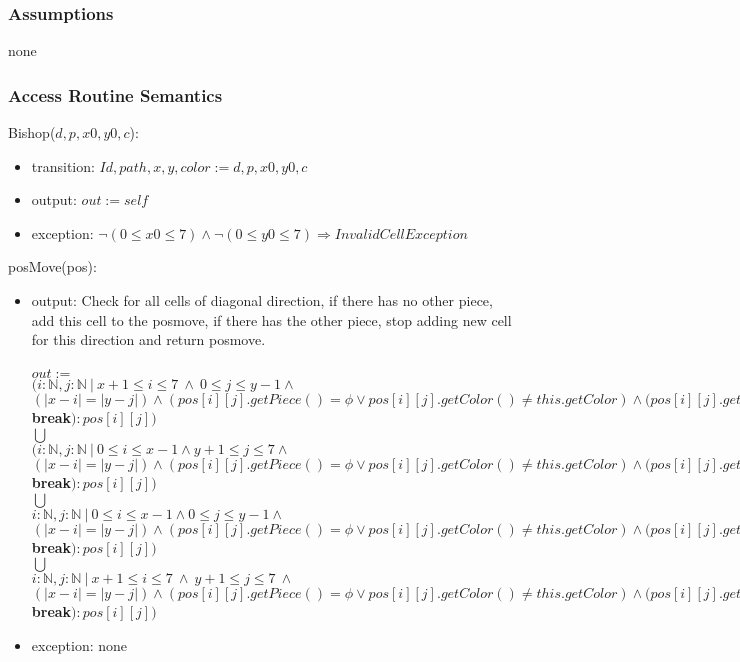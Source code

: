 \documentclass[12pt]{article}
\begin{document}
\subsubsection* {Assumptions}

none

\subsubsection* {Access Routine Semantics}

Bishop($d, p, x0, y0, c$):
\begin{itemize}
\item transition: $Id, path, x, y, color := d, p, x0, y0, c$
\item output: $out := \mathit{self}$
\item exception: $ \neg (0 \leq x0 \leq 7) \wedge  \neg (0 \leq y0 \leq 7) \Rightarrow InvalidCellException$
\end{itemize}

\noindent posMove(pos):
\begin{itemize}
\item output: Check for all cells of diagonal direction, if there has no other piece, add this cell to the posmove, if there has the other piece, stop adding new cell for this direction and return posmove.\\
\\
$out :=$\\
$(i : \mathbb{N}, j : \mathbb{N}\ |\  x + 1 \leq i \leq 7 \ \wedge \  0 \leq j \leq y - 1 \wedge $ \\
$ (|x-i| = |y-j|) \wedge (pos[i][j].getPiece() = \phi \vee pos[i][j].getColor() \ne this.getColor) \wedge (pos[i][j].getColor() = this.getColor() \Rightarrow$ \textbf{break}$) : pos[i][j])$\\
$\bigcup$ \\
$(i : \mathbb{N}, j : \mathbb{N}\ |\ 0 \leq i \leq x - 1 \wedge y + 1 \leq j \leq 7 \wedge $ \\ 
$(|x-i| = |y-j|) \wedge (pos[i][j].getPiece() = \phi \vee pos[i][j].getColor() \ne this.getColor) \wedge (pos[i][j].getColor() = this.getColor() \Rightarrow$ \textbf{break}$) : pos[i][j])$\\
$\bigcup$ \\
$i : \mathbb{N}, j : \mathbb{N}\ |\ 0 \leq i \leq x - 1 \wedge 0 \leq j \leq y - 1 \wedge \  $ \\ 
$(|x-i| = |y-j|) \wedge (pos[i][j].getPiece() = \phi \vee pos[i][j].getColor() \ne this.getColor) \wedge (pos[i][j].getColor() = this.getColor() \Rightarrow$ \textbf{break}$) : pos[i][j])$\\
$\bigcup$ \\
$i : \mathbb{N}, j : \mathbb{N}\ |\ x + 1 \leq i \leq 7\ \wedge\  y + 1 \leq j \leq 7 \ \wedge \  $ \\ 
$(|x-i| = |y-j|) \wedge (pos[i][j].getPiece() = \phi \vee pos[i][j].getColor() \ne this.getColor) \wedge (pos[i][j].getColor() = this.getColor() \Rightarrow$ \textbf{break}$) : pos[i][j])$
\item exception: none
\end{itemize}
\end{document}
